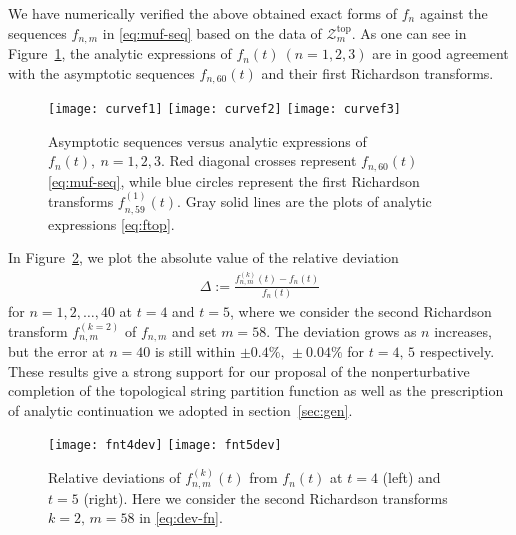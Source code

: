 \documentclass[11pt]{article}
\newcommand{\Ztop}{\mathcal{Z}^{\text{top}}}
\renewcommand{\[}{\begin{eqnarray}}
\renewcommand{\]}{\end{eqnarray}}
\newcommand{\ftop}{f}
\begin{document}
We have numerically verified
the above obtained exact forms of $\ftop_n$
against the sequences $\ftop_{n,m}$ in \eqref{eq:muf-seq}
based on the data of $\Ztop_m$.
As one can see in Figure~\ref{fig:curvefn},
the analytic expressions of $f_n(t)\ (n=1,2,3)$
are in good agreement with the
asymptotic sequences $f_{n,60}(t)$
and their first Richardson transforms.
%
\begin{figure}[tb]
\begin{center}
\texttt{[image: curvef1]}
\texttt{[image: curvef2]}
\texttt{[image: curvef3]}
\end{center}
\vspace{-2ex}
\caption{Asymptotic sequences
versus analytic expressions of $f_n(t),\ n=1,2,3$.
Red diagonal crosses represent $f_{n,60}(t)$ \eqref{eq:muf-seq},
while blue circles represent the first Richardson transforms
$f_{n,59}^{(1)}(t)$.
Gray solid lines are
the plots of analytic expressions \eqref{eq:ftop}.}
\label{fig:curvefn}
\end{figure}
%
In Figure~\ref{fig:fdev}, we plot the absolute value of
the relative deviation
%
\begin{align}
\Delta := \frac{f_{n,m}^{(k)}(t)-f_n(t)}{f_n(t)}
\label{eq:dev-fn}
\end{align}
%
for $n=1,2,\ldots,40$ at $t=4$ and $t=5$,
where we consider the second Richardson transform
$f_{n,m}^{(k=2)}$ of $f_{n,m}$ and set $m=58$.
%
The deviation grows as $n$ increases,
but the error at $n=40$ is still
within $\pm 0.4\%,\, \pm 0.04\%$ for $t=4,\,5$ respectively.
These results give a strong support
for our proposal of the nonperturbative completion
of the topological string partition function
as well as the prescription of analytic continuation
we adopted in section~\ref{sec:gen}.
%
\begin{figure}[tb]
\begin{center}
\texttt{[image: fnt4dev]}
\hspace{1cm}
\texttt{[image: fnt5dev]}
\end{center}
\vspace{-2ex}
\caption{Relative deviations of $f_{n,m}^{(k)}(t)$ from $f_n(t)$
at $t=4$ (left) and $t=5$ (right).
Here we consider
the second Richardson transforms $k=2,\,m=58$ in \eqref{eq:dev-fn}.}
\label{fig:fdev}
\end{figure}
%
\end{document}
